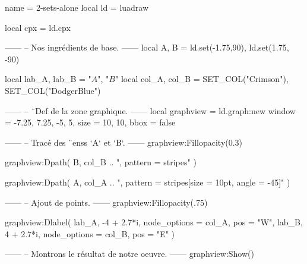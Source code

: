 \documentclass[border = 3pt]{standalone}
\begin{document}
\begin{luadraw*}{name = 2-sets-alone}
local ld = luadraw

local cpx = ld.cpx

------
-- Nos ingrédients de base.
------
local A, B = ld.set(-1.75,90), ld.set(1.75, -90)

local lab_A, lab_B = "$A$", "$B$"
local col_A, col_B = SET_COL("Crimson"), SET_COL("DodgerBlue")

------
-- ¨Def de la zone graphique.
------
local graphview = ld.graph:new{
  window = {-7.25, 7.25, -5, 5},
  size   = {10, 10},
  bbox   = false
}

------
-- Tracé des ¨enss `A` et `B`.
------
graphview:Fillopacity(0.3)

graphview:Dpath(
  B,
  col_B .. ", pattern = stripes"
)

graphview:Dpath(
  A,
  col_A .. ", pattern = {stripes[size = 10pt, angle = -45]}"
)

------
-- Ajout de points.
------
graphview:Fillopacity(.75)

graphview:Dlabel(
  lab_A, -4 + 2.7*i, {node_options = col_A, pos = "W"},
  lab_B,  4 + 2.7*i, {node_options = col_B, pos = "E"}
)

------
-- Montrons le résultat de notre oeuvre.
------
graphview:Show()
\end{luadraw*}
\end{document}
